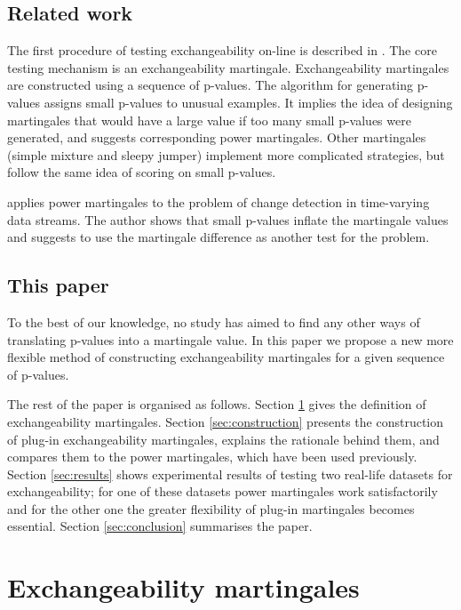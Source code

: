 \documentclass{article}
\theoremstyle{definition}
\begin{document}
\subsection{Related work}

The first procedure of testing exchangeability on-line is described
in \citet{vovk/nouretdinov/gammerman:2003}.
The core testing mechanism is an exchangeability martingale.
Exchangeability martingales are constructed using a sequence of p-values.
The algorithm for generating p-values assigns small p-values to unusual examples.
It implies the idea of designing martingales that would have a large value if too many small p-values were generated,
and suggests corresponding power martingales.
Other martingales (simple mixture and sleepy jumper) implement more
complicated strategies, but follow the same idea of scoring on small p-values.

\citet{ho:2005} applies power martingales to the problem of change detection
in time-varying data streams.
The author shows that small p-values inflate the martingale values
and suggests to use the martingale difference as another test for the problem.

\subsection{This paper}

To the best of our knowledge, no study has aimed to find any other ways of translating p-values
into a martingale value.
In this paper we propose a new more flexible method of constructing exchangeability martingales
for a given sequence of p-values.

The rest of the paper is organised as follows.
Section \ref{sec:definition} gives the definition of exchangeability martingales.
Section \ref{sec:construction} presents the construction of plug-in exchangeability martingales,
explains the rationale behind them, and compares them to the power martingales,
which have been used previously.
Section \ref{sec:results} shows experimental results of testing two real-life datasets for exchangeability;
for one of these datasets power martingales work satisfactorily and for the other one the greater flexibility
of plug-in martingales becomes essential.
Section \ref{sec:conclusion} summarises the paper.

\section{Exchangeability martingales}
\label{sec:definition}
\end{document}
